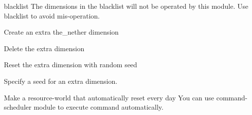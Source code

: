 \begin{Configuration}
    \item[blacklist]{
        The dimensions in the blacklist will not be operated by this module.
        Use blacklist to avoid mis-operation.
    }
\end{Configuration}

\begin{example}{Create an extra the\_nether dimension}
\end{example}

\begin{example}{Delete the extra dimension}
\end{example}

\begin{example}{Reset the extra dimension with random seed}
\end{example}

\begin{example}{Specify a seed for an extra dimension.}
    \\
\end{example}

\begin{tips}{Make a resource-world that automatically reset every day}
    You can use command-scheduler module to execute  command automatically.
\end{tips}